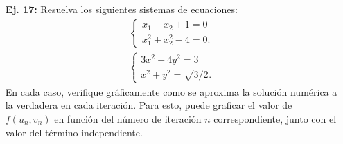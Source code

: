 \documentclass[11pt]{article}
\begin{document}
\begin{itemize}
\item[{\bf Ej. 17:}] Resuelva los siguientes sistemas de ecuaciones:
\begin{eqnarray*}
\begin{cases}
x_1-x_2+1 = 0\\
x_1^2+ x_2^2-4 = 0.
\end{cases}
\end{eqnarray*}
\begin{eqnarray*}
\begin{cases}
3x^2 + 4y^2 = 3\\
x^2 + y^2 = \sqrt{3{/}2}.
\end{cases}
\end{eqnarray*}
En cada caso, verifique gr\'aficamente como se aproxima la soluci\'on num\'erica a la verdadera en cada iteraci\'on. Para esto, puede graficar el valor de $f(u_n,v_n)$ en funci\'on del n\'umero de iteraci\'on $n$ correspondiente, junto con el valor del t\'ermino independiente.
\end{itemize}
\end{document}
